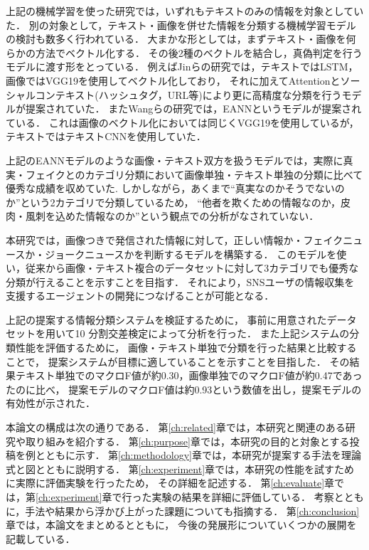 上記の機械学習を使った研究では，いずれもテキストのみの情報を対象としていた．
別の対象として，テキスト・画像を併せた情報を分類する機械学習モデルの検討も数多く行われている．
大まかな形としては，まずテキスト・画像を何らかの方法でベクトル化する．
その後2種のベクトルを結合し，真偽判定を行うモデルに渡す形をとっている．
例えばJinらの研究\cite{Jin:2017:MFR:3123266.3123454}では，テキストではLSTM，画像ではVGG19を使用してベクトル化しており，
それに加えてAttentionとソーシャルコンテキスト(ハッシュタグ，URL等)により更に高精度な分類を行うモデルが提案されていた．
またWangらの研究\cite{Wang:2018:EEA:3219819.3219903}では，EANNというモデルが提案されている．
これは画像のベクトル化においては同じくVGG19を使用しているが，テキストではテキストCNNを使用していた．

上記のEANNモデルのような画像・テキスト双方を扱うモデルでは，実際に真実・フェイクとのカテゴリ分類において画像単独・テキスト単独の分類に比べて優秀な成績を収めていた\cite{Wang:2018:EEA:3219819.3219903}.\@
しかしながら，あくまで``真実なのかそうでないのか''という2カテゴリで分類しているため，
``他者を欺くための情報なのか，皮肉・風刺を込めた情報なのか''という観点での分析がなされていない．

本研究では，画像つきで発信された情報に対して，正しい情報か・フェイクニュースか・ジョークニュースかを判断するモデルを構築する．
このモデルを使い，従来から画像・テキスト複合のデータセットに対して3カテゴリでも優秀な分類が行えることを示すことを目指す．
それにより，SNSユーザの情報収集を支援するエージェントの開発につなげることが可能となる．

上記の提案する情報分類システムを検証するために，
事前に用意されたデータセットを用いて10 分割交差検定によって分析を行った．
また上記システムの分類性能を評価するために，
画像・テキスト単独で分類を行った結果と比較することで，
提案システムが目標に適していることを示すことを目指した．
その結果テキスト単独でのマクロF値が約0.30，画像単独でのマクロF値が約0.47であったのに比べ，
提案モデルのマクロF値は約0.93という数値を出し，提案モデルの有効性が示された．

本論文の構成は次の通りである．
第\ref{ch:related}章では，本研究と関連のある研究や取り組みを紹介する．
第\ref{ch:purpose}章では，本研究の目的と対象とする投稿を例とともに示す．
第\ref{ch:methodology}章では，本研究が提案する手法を理論式と図とともに説明する．
第\ref{ch:experiment}章では，本研究の性能を試すために実際に評価実験を行ったため，
その詳細を記述する．
第\ref{ch:evaluate}章では，第\ref{ch:experiment}章で行った実験の結果を詳細に評価している．
考察とともに，手法や結果から浮かび上がった課題についても指摘する．
第\ref{ch:conclusion}章では，本論文をまとめるとともに，
今後の発展形についていくつかの展開を記載している．